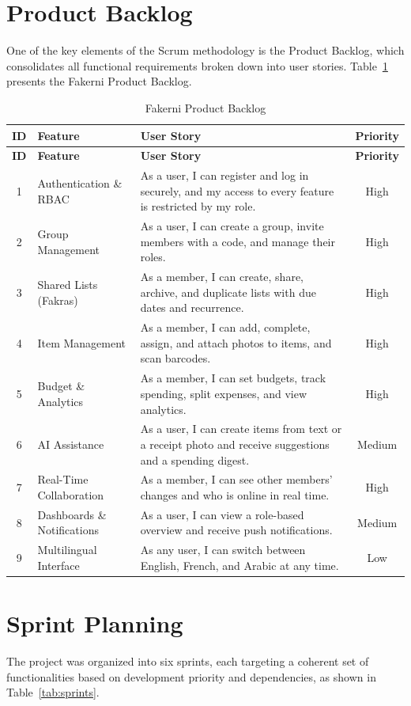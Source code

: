 \documentclass[12pt,a4paper,oneside]{report}
\begin{document}
\section{Product Backlog}
One of the key elements of the Scrum methodology is the Product Backlog, which
consolidates all functional requirements broken down into user stories.
Table~\ref{tab:backlog} presents the Fakerni Product Backlog.

\begin{longtable}{|c|p{3.2cm}|p{7.2cm}|c|}
\caption{Fakerni Product Backlog}\label{tab:backlog}\\
\hline
\textbf{ID} & \textbf{Feature} & \textbf{User Story} & \textbf{Priority} \\ \hline
\endfirsthead
\hline \textbf{ID} & \textbf{Feature} & \textbf{User Story} & \textbf{Priority} \\ \hline
\endhead
1 & Authentication \& RBAC & As a user, I can register and log in securely, and my
access to every feature is restricted by my role. & High \\ \hline
2 & Group Management & As a user, I can create a group, invite members with a
code, and manage their roles. & High \\ \hline
3 & Shared Lists (Fakras) & As a member, I can create, share, archive, and
duplicate lists with due dates and recurrence. & High \\ \hline
4 & Item Management & As a member, I can add, complete, assign, and attach photos
to items, and scan barcodes. & High \\ \hline
5 & Budget \& Analytics & As a member, I can set budgets, track spending, split
expenses, and view analytics. & High \\ \hline
6 & AI Assistance & As a user, I can create items from text or a receipt photo and
receive suggestions and a spending digest. & Medium \\ \hline
7 & Real-Time Collaboration & As a member, I can see other members' changes and
who is online in real time. & High \\ \hline
8 & Dashboards \& Notifications & As a user, I can view a role-based overview and
receive push notifications. & Medium \\ \hline
9 & Multilingual Interface & As any user, I can switch between English, French, and
Arabic at any time. & Low \\ \hline
\end{longtable}

\section{Sprint Planning}
The project was organized into six sprints, each targeting a coherent set of
functionalities based on development priority and dependencies, as shown in
Table~\ref{tab:sprints}.
\end{document}
